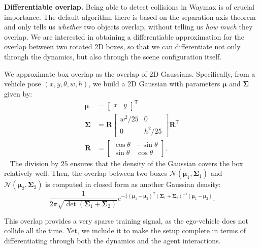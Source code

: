 \textbf{Differentiable overlap.} Being able to detect collisions in Waymax \cite{gulino2024waymax} is of crucial importance. The default algorithm there is based on the separation axis theorem and only tells us \emph{whether} two objects overlap, without telling us \emph{how much} they overlap. We are interested in obtaining a differentiable approximation for the overlap between two rotated 2D boxes, so that we can differentiate not only through the dynamics, but also through the scene configuration itself.

We approximate box overlap as the overlap of 2D Gaussians. Specifically, from a vehicle pose $(x, y, \theta, w, h)$, we build a 2D Gaussian with parameters $\boldsymbol{\mu}$ and $\boldsymbol{\Sigma}$ given by:
~
\begin{align}
\boldsymbol{\mu} &= \begin{bmatrix} x & y \end{bmatrix}^\mathsf{T} \\
\boldsymbol{\Sigma} &=  \boldsymbol{R} \begin{bmatrix}
    w^2/25 & 0 \\ 0 & h^2/25
\end{bmatrix} \boldsymbol{R}^\mathsf{T}\\
\boldsymbol{R} &= \begin{bmatrix}
    \cos \theta & -\sin \theta \\ \sin\theta & \cos \theta
\end{bmatrix}.
\end{align}
~
The division by $25$ ensures that the density of the Gaussian covers the box relatively well. Then, the overlap between two boxes $\mathcal{N}(\boldsymbol{\mu}_1, \boldsymbol{\Sigma}_1)$ and $\mathcal{N}(\boldsymbol{\mu}_2, \boldsymbol{\Sigma}_2)$ is computed in closed form as another Gaussian density:
\begin{equation} 
\frac{1}{2 \pi \sqrt{\det(\boldsymbol{\Sigma}_1 + \boldsymbol{\Sigma}_2)}}e^{-\frac{1}{2} (\boldsymbol{\mu}_1 - \boldsymbol{\mu}_2)^\mathsf{T} (\boldsymbol{\Sigma}_1 + \boldsymbol{\Sigma}_2)^{-1} (\boldsymbol{\mu}_1 - \boldsymbol{\mu}_2)}.
\end{equation}

This overlap provides a very sparse training signal, as the ego-vehicle does not collide all the time. Yet, we include it to make the setup complete in terms of differentiating through both the dynamics and the agent interactions.